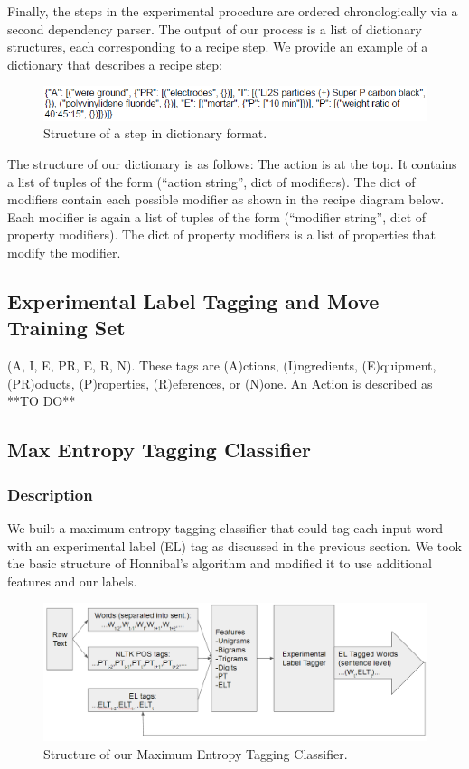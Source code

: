 Finally, the steps in the experimental procedure are ordered chronologically via a second dependency parser. The output of our process is a list of dictionary structures, each corresponding to a recipe step. We provide an example of a dictionary that describes a recipe step:

\begin{figure}
  \centering
    \includegraphics[width=.5\textwidth]{sampleout.png}
  \caption{Structure of a step in dictionary format.}
\end{figure}

The structure of our dictionary is as follows: The action is at the top. It contains a list of tuples of the form (“action string”, dict of modifiers). The dict of modifiers contain each possible modifier as shown in the recipe diagram below. Each modifier is again a list of tuples of the form (“modifier string”, dict of property modifiers). The dict of property modifiers is a list of properties that modify the modifier.

\subsection{Experimental Label Tagging and Move Training Set}

(A, I, E, PR, E, R, N). These tags are (A)ctions, (I)ngredients, (E)quipment, (PR)oducts, (P)roperties, (R)eferences, or (N)one. An Action is described as **TO DO** 

\subsection{Max Entropy Tagging Classifier}

\subsubsection{Description}
We built a maximum entropy tagging classifier that could tag each input word with an experimental label (EL) tag as discussed in the previous section. We took the basic structure of Honnibal's algorithm \cite{honnibal} and modified it to use additional features and our labels.

\begin{figure}
  \centering
    \includegraphics[width=.5\textwidth]{tagger.png}
  \caption{Structure of our Maximum Entropy Tagging Classifier.}
\end{figure}

